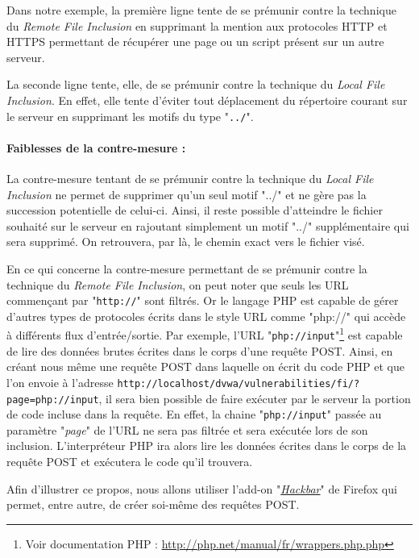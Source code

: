 Dans notre exemple, la première ligne tente de se prémunir contre la technique du \textit{Remote File Inclusion} en supprimant la mention aux protocoles HTTP et HTTPS permettant de récupérer une page ou un script présent sur un autre serveur.

La seconde ligne tente, elle, de se prémunir contre la technique du \textit{Local File Inclusion}. En effet, elle tente d'éviter tout déplacement du répertoire courant sur le serveur en supprimant les motifs du type "\texttt{../}".

\paragraph{Faiblesses de la contre-mesure :}

La contre-mesure tentant de se prémunir contre la technique du \textit{Local File Inclusion} ne permet de supprimer qu'un seul motif "../" et ne gère pas la succession potentielle de celui-ci. Ainsi, il reste possible d'atteindre le fichier souhaité sur le serveur en rajoutant simplement un motif "../" supplémentaire qui sera supprimé. On retrouvera, par là, le chemin exact vers le fichier visé.

En ce qui concerne la contre-mesure permettant de se prémunir contre la technique du \textit{Remote File Inclusion}, on peut noter que seuls les URL commençant par "\texttt{http://}" sont filtrés. Or le langage PHP est capable de gérer d'autres types de protocoles écrits dans le style URL comme "php://" qui accède à différents flux d'entrée/sortie. Par exemple, l'URL "\texttt{php://input}"\footnote{Voir documentation PHP : \url{http://php.net/manual/fr/wrappers.php.php}} est capable de lire des données brutes écrites dans le corps d'une requête POST. Ainsi, en créant nous même une requête POST dans laquelle on écrit du code PHP et que l'on envoie à l'adresse \texttt{http://localhost/dvwa/vulnerabilities/fi/?page=php://input}, il sera bien possible de faire exécuter par le serveur la portion de code incluse dans la requête. En effet, la chaine "\texttt{php://input}" passée au paramètre "\textit{page}" de l'URL ne sera pas filtrée et sera exécutée lors de son inclusion. L'interpréteur PHP ira alors lire les données écrites dans le corps de la requête POST et exécutera le code qu'il trouvera.

Afin d'illustrer ce propos, nous allons utiliser l'add-on "\href{https://addons.mozilla.org/fr/firefox/addon/hackbar/}{\textit{Hackbar}}" de Firefox qui permet, entre autre, de créer soi-même des requêtes POST.


